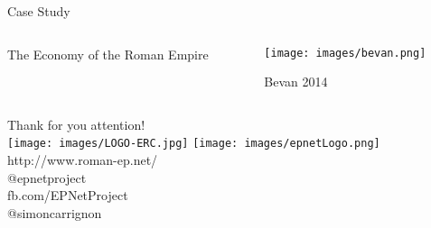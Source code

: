 \documentclass[12pt, notes=show]{beamer}
\begin{document}
\begin{frame}{Case Study}

    \begin{columns}
	\begin{column}{.35\textwidth}
	The Economy of the Roman Empire \\
	\end{column}
	\begin{column}{.6\textwidth}
	\begin{figure}
	    \texttt{[image: images/bevan.png]}\\
	\caption{\scriptsize Bevan 2014}
	\end{figure}
	\end{column}
    \end{columns}
\end{frame}

\begin{frame}
	\begin{center}
		\Large
    Thank for you attention!\\
		\texttt{[image: images/LOGO-ERC.jpg]} \hfil	\texttt{[image: images/epnetLogo.png]}\\
		\vspace{1cm}
		\scriptsize
			http://www.roman-ep.net/\\
			@epnetproject\\
			fb.com/EPNetProject\\
			@simoncarrignon
	\end{center}


\end{frame}

\end{document}

